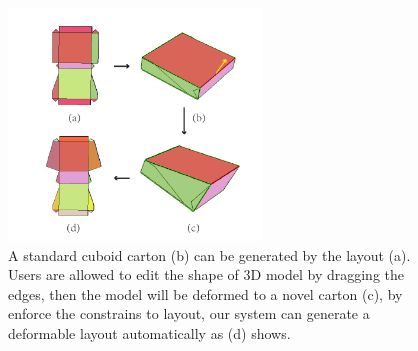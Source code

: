 \begin{figure}
	\centering
	\includegraphics[width=0.6\textwidth]{images/editing}
	\caption{A standard cuboid carton (b) can be generated by the layout (a). Users are allowed to edit the shape of 3D model by dragging the edges, then the model will be deformed to a novel carton (c), by enforce the constrains to layout, our system can generate a deformable layout automatically as (d) shows.}
	\label{fig:editing}
\end{figure}